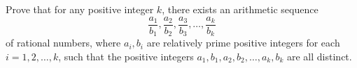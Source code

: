 Prove that for any positive integer $ k$, there exists an arithmetic sequence \[ \frac{a_1}{b_1}, \frac{a_2}{b_2}, \frac{a_3}{b_3}, \ldots ,\frac{a_k}{b_k}\] of rational numbers, where $ a_i, b_i$ are relatively prime positive integers for each $ i = 1,2,\ldots,k$, such that the positive integers $ a_1, b_1, a_2, b_2, \ldots,  a_k, b_k$ are all distinct.